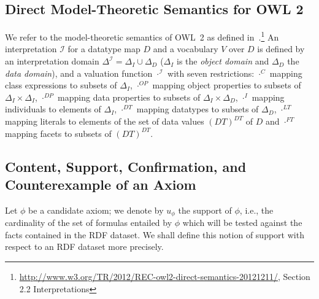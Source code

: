 \documentclass{sig-alternate}
\begin{document}
\subsection{Direct Model-Theoretic Semantics for OWL 2}
We refer to the model-theoretic semantics of OWL~2 as defined in~\cite{OWL2-direct-semantics}.\footnote{\url{http://www.w3.org/TR/2012/REC-owl2-direct-semantics-20121211/}, Section 2.2 Interpretations}
An interpretation $\mathcal{I}$ for a datatype map $D$ and a vocabulary $V$ over $D$ is defined by an interpretation domain $\Delta^\mathcal{I}=\Delta_{I}\cup\Delta_{D}$  ($\Delta_{I}$ is the \textit{object domain} and $\Delta_{D}$ the \textit{data domain}), and a valuation function $\cdot^{\mathcal{I}}$ with seven restrictions: $\cdot^{C}$ mapping class expressions to subsets of $\Delta_{I}$,  $\cdot^{OP}$ mapping object properties to subsets of $\Delta_{I}\times\Delta_{I}$, $\cdot^{DP}$ mapping data properties to subsets of $\Delta_{I}\times\Delta_{D}$, $\cdot^{I}$ mapping individuals to elements of $\Delta_{I}$, $\cdot^{DT}$ mapping datatypes to subsets of $\Delta_{D}$, $\cdot^{LT}$ mapping literals to elements of the set of data values $(DT)^{DT}$ of $D$ and $\cdot^{FT}$ mapping facets to subsets of $(DT)^{DT}$.

\subsection{Content, Support, Confirmation, and Counterexample of an Axiom}
 
Let $\phi$ be a candidate axiom; we denote by $u_\phi$ the support of $\phi$,
i.e., the cardinality of the set of formulas entailed by $\phi$ which will be tested
against the facts contained in the RDF dataset.
We shall define this notion of support with respect to an RDF dataset more precisely.

\end{document}
